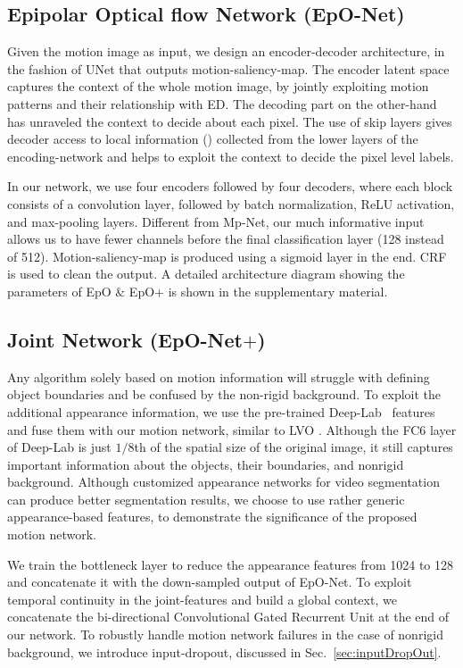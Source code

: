 \documentclass[10pt,twocolumn,letterpaper]{article}
\begin{document}
\subsection{Epipolar Optical flow Network (EpO-Net)}
Given the motion image as input, we design an encoder-decoder architecture, in the fashion of UNet \cite{uNet} that outputs motion-saliency-map.
The encoder latent space captures the context of the whole motion image, by jointly exploiting motion patterns and their relationship with ED. 
The decoding part on the other-hand has unraveled the context to decide about each pixel. 
The use of skip layers gives decoder access to local information (\cite{devildecoder}) collected from the lower layers of the encoding-network and helps to exploit the context to decide the pixel level labels. 

In our network, we use four encoders followed by four decoders, where each block consists of a convolution layer, followed by batch normalization, ReLU activation, and max-pooling layers. 
Different from Mp-Net, our much informative input allows us to have fewer channels before the final classification layer (128 instead of 512). Motion-saliency-map is produced using a sigmoid layer in the end. CRF is used to clean the output. A detailed architecture diagram showing the parameters of EpO $\&$ EpO$+$ is shown in the supplementary material. 


\subsection{Joint Network (EpO-Net$+$)}

Any algorithm solely based on motion information will struggle with defining object boundaries and be confused by the non-rigid background. To exploit the additional appearance information, we use the pre-trained Deep-Lab~\cite{deeplab} features and fuse them with our motion network, similar to LVO \cite{visMem}. Although the FC6 layer of Deep-Lab is just $1/8$th of the spatial size of the original image, it still captures important information about the objects, their boundaries, and nonrigid background. Although customized appearance networks for video segmentation can produce better segmentation results, we choose to use rather generic appearance-based features, to demonstrate the significance of the proposed motion network.

We train the bottleneck layer to reduce the appearance features from 1024 to 128 and concatenate it with the down-sampled output of EpO-Net. To exploit temporal continuity in the joint-features and build a global context, we concatenate the bi-directional Convolutional Gated Recurrent Unit at the end of our network. To robustly handle motion network failures in the case of nonrigid background, we introduce input-dropout, discussed in Sec.~\ref{sec:inputDropOut}.
 
\end{document}
